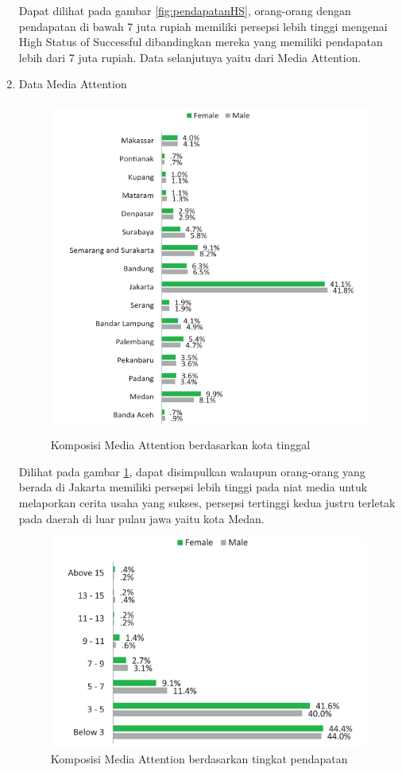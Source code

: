 \begin{enumerate}
Dapat dilihat pada gambar \ref{fig:pendapatanHS}, orang-orang dengan pendapatan di bawah 7 juta rupiah memiliki persepsi lebih tinggi mengenai High Status of Successful dibandingkan mereka yang memiliki pendapatan lebih dari 7 juta rupiah. Data selanjutnya yaitu dari Media Attention.
	
	\item Data Media Attention
\begin{figure} [H]
	\centering  
	\includegraphics[width=12cm, height=11cm]{lokasiPMA2013} 
	\caption[Komposisi Media Attention berdasarkan kota tinggal]{Komposisi Media Attention berdasarkan kota tinggal} 
	\label{fig:lokasiPMA} 
\end{figure} 

Dilihat pada gambar \ref{fig:lokasiPMA}, dapat disimpulkan walaupun orang-orang yang berada di Jakarta memiliki persepsi lebih tinggi pada niat media untuk melaporkan cerita usaha yang sukses, persepsi tertinggi kedua justru terletak pada daerah di luar pulau jawa yaitu kota Medan.

\begin{figure} [H]
	\centering  
	\includegraphics[width=12cm, height=7cm]{pendapatanPMA2013} 
	\caption[Komposisi Media Attention berdasarkan tingkat pendapatan]{Komposisi Media Attention berdasarkan tingkat pendapatan} 
	\label{fig:pendapatanPMA} 
\end{figure} 


\end{enumerate}
